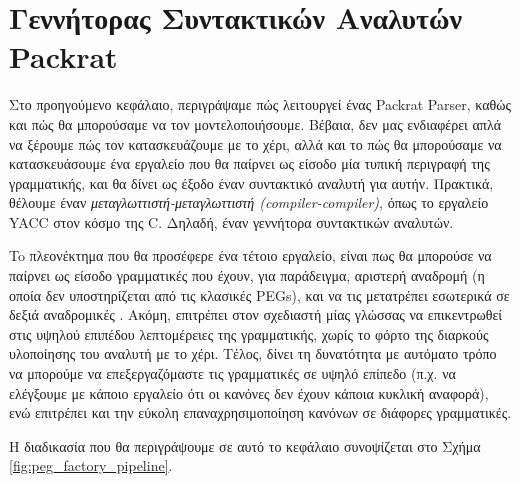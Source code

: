 \chapter{ Γεννήτορας Συντακτικών Αναλυτών Packrat }

Στο προηγούμενο κεφάλαιο, περιγράψαμε πώς λειτουργεί ένας Packrat Parser, καθώς και πώς θα μπορούσαμε να τον μοντελοποιήσουμε. 
Βέβαια, δεν μας ενδιαφέρει απλά να ξέρουμε πώς τον κατασκευάζουμε με το χέρι, αλλά και το πώς θα μπορούσαμε να κατασκευάσουμε ένα εργαλείο που θα παίρνει ως είσοδο μία τυπική περιγραφή της γραμματικής, και θα δίνει ως έξοδο έναν συντακτικό αναλυτή για αυτήν.
Πρακτικά, θέλουμε έναν \textit{μεταγλωττιστή-μεταγλωττιστή (compiler-compiler)}, όπως το εργαλείο YACC στον κόσμο της C. Δηλαδή, έναν γεννήτορα συντακτικών αναλυτών.

To πλεονέκτημα που θα προσέφερε ένα τέτοιο εργαλείο, είναι πως θα μπορούσε να παίρνει ως είσοδο γραμματικές που έχουν, για παράδειγμα, αριστερή αναδρομή (η οποία δεν υποστηρίζεται από τις κλασικές PEGs), και να τις μετατρέπει εσωτερικά σε δεξιά αναδρομικές \cite{Ford2002a}.
Ακόμη, επιτρέπει στον σχεδιαστή μίας γλώσσας να επικεντρωθεί στις υψηλού επιπέδου λεπτομέρειες της γραμματικής, χωρίς το φόρτο της διαρκούς υλοποίησης του αναλυτή με το χέρι. 
Τέλος, δίνει τη δυνατότητα με αυτόματο τρόπο να μπορούμε να επεξεργαζόμαστε τις γραμματικές σε υψηλό επίπεδο (π.χ. να ελέγξουμε με κάποιο εργαλείο ότι οι κανόνες δεν έχουν κάποια κυκλική αναφορά), ενώ επιτρέπει και την εύκολη επαναχρησιμοποίηση κανόνων σε διάφορες γραμματικές.

Η διαδικασία που θα περιγράψουμε σε αυτό το κεφάλαιο συνοψίζεται στο Σχήμα \ref{fig:peg_factory_pipeline}. %

